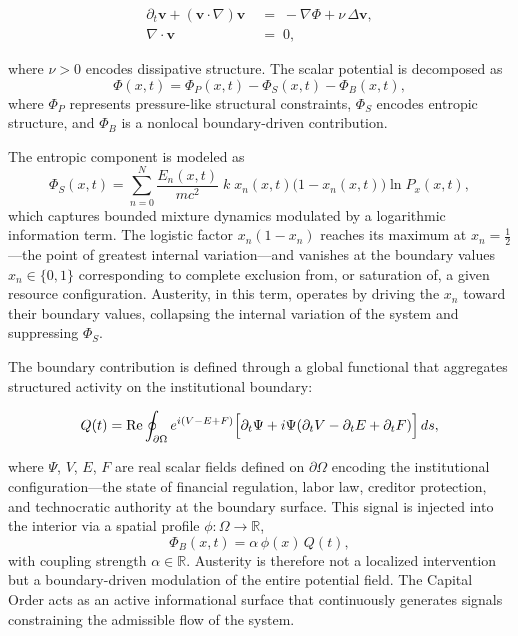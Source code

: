 \documentclass[12pt,a4paper]{article}
\begin{document}
\begin{highlight}
\begin{align*}
\partial_t \mathbf{v} + (\mathbf{v}\cdot\nabla)\mathbf{v}
&\;=\;
-\nabla\Phi + \nu\,\Delta\mathbf{v}, \\[4pt]
\nabla\cdot\mathbf{v} &\;=\; 0,
\end{align*}
\end{highlight}

where $\nu > 0$ encodes dissipative structure. The scalar potential is decomposed as
\[
\Phi(x,t) = \Phi_P(x,t) - \Phi_S(x,t) - \Phi_B(x,t),
\]
where $\Phi_P$ represents pressure-like structural constraints, $\Phi_S$ encodes entropic structure, and $\Phi_B$ is a nonlocal boundary-driven contribution.

The entropic component is modeled as
\[
\Phi_S(x,t)
=
\sum_{n=0}^{N}
\frac{E_n(x,t)}{mc^2}\;k\;x_n(x,t)\bigl(1-x_n(x,t)\bigr)\ln P_x(x,t),
\]
which captures bounded mixture dynamics modulated by a logarithmic information term. The logistic factor $x_n(1-x_n)$ reaches its maximum at $x_n = \tfrac{1}{2}$---the point of greatest internal variation---and vanishes at the boundary values $x_n \in \{0,1\}$ corresponding to complete exclusion from, or saturation of, a given resource configuration. Austerity, in this term, operates by driving the $x_n$ toward their boundary values, collapsing the internal variation of the system and suppressing $\Phi_S$.

The boundary contribution is defined through a global functional that aggregates structured activity on the institutional boundary:

\begin{highlight}
\[
Q(t)
=
\operatorname{Re}
\oint_{\partial\Omega}
e^{i(V-E+F)}
\Bigl[
\partial_t \Psi
+
i\Psi(\partial_t V-\partial_t E+\partial_t F)
\Bigr]\,ds,
\]
\end{highlight}

where $\Psi$, $V$, $E$, $F$ are real scalar fields defined on $\partial\Omega$ encoding the institutional configuration---the state of financial regulation, labor law, creditor protection, and technocratic authority at the boundary surface. This signal is injected into the interior via a spatial profile $\phi:\Omega\to\mathbb{R}$,
\[
\Phi_B(x,t) = \alpha\,\phi(x)\,Q(t),
\]
with coupling strength $\alpha \in \mathbb{R}$. Austerity is therefore not a localized intervention but a boundary-driven modulation of the entire potential field. The Capital Order acts as an active informational surface that continuously generates signals constraining the admissible flow of the system.
\end{document}
